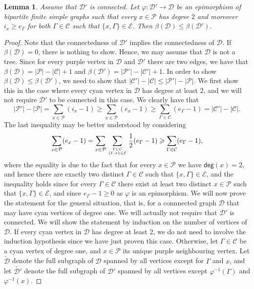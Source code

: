 \documentclass[a4paper,12pt,reqno]{amsart}
\newcommand\mc\mathcal
\newtheorem{lem}[thm]{Lemma}
\theoremstyle{definition}
\numberwithin{equation}{thm}
\renewcommand{\leq}{\leqslant}
\renewcommand{\geq}{\geqslant}
\renewcommand{\deg}{\mathsf{deg}}
\begin{document}
\begin{lem}\label{Betti-epimorphism} Assume that $\mc{D}'$ is connected.
    Let $\varphi: \mc{D}' \to \mc{D}$ be an epimorphism of bipartite finite simple graphs such that every $x\in \mc{P}$ has degree $2$ and moreover $i_x \geq e_\Gamma$ for both $\Gamma \in \mc{C}$ such that $\{x, \Gamma\} \in \mathcal{E}$.
    Then $\beta(\mc{D}) \leq \beta(\mc{D}')$.
\end{lem}
\begin{proof} Note that the connectedness of $\mc{D}'$ implies the connectedness of $\mc{D}$.
If $\beta(\mc{D})=0$, there is nothing to show. Hence, we may assume that $\mc{D}$ is not a tree.
Since for every purple vertex in $\mc{D}$ and $\mc{D}'$ there are two edges, we have that 
$\beta(\mathcal{D})=|\mc{P}|-|\mc{C}|+1$ and
$\beta(\mc{D}')=|\mc{P}'|-|\mc{C}'|+1$. 
In order to show $\beta(\mathcal{D})\leq \beta(\mathcal{D}')$, we need to show that $|\mc{C}'|-|\mc{C}|\leq |\mc{P}'|-|\mc{P}|.$
We first show this in the case where every cyan vertex in $\mathcal{D}$ has degree at least $2$, and we will not require $\mc{D}'$ to be connected in this case. We clearly have that 
$$|\mc{P}'|-|\mc{P}| = \sum_{x\in\mc{P}}(i_x-1)\geq \sum_{x\in\mc{P}}(e_x-1)\geq \sum_{\Gamma\in\mc{C}}(e_\Gamma-1)=|\mc{C}'|-|\mc{C}|.$$
The last inequality may be better understood by considering $$\sum_{x\in\mc{P}}(e_x-1)= \sum_{x\in\mc{P}} \sum_{\Gamma \in \mc C \atop \{\Gamma, x\} \in \mathcal{E}}\frac{1}{2}(e_{\Gamma}-1) \geq \sum_{\Gamma\in\mc{C}}(e_\Gamma-1),$$ where the equality is due to the fact that for every $x \in \mc{P}$ we have $\deg(x)=2$, and hence there are exactly two distinct $\Gamma \in \mc{C}$ such that $\{x, \Gamma\} \in \mc{E}$, and the inequality holds since for every $\Gamma \in \mc{C}$ there exist at least two distinct $x \in \mc{P}$ such that $\{x,\Gamma\} \in \mc{E}$, and since $e_\Gamma -1 \geq 0$ as $\varphi$ is an epimorphism.
We will now prove the statement for the general situation, that is, for a connnected graph $\mc{D}$ that may have cyan vertices of degree one. We will actually not require that $\mc{D}'$ is connected. We will show the statement by induction on the number of vertices of $\mc{D}$. If every cyan vertex in $\mc{D}$ has degree at least $2$, we do not need to involve the induction hypothesis since we have just proven this case. Otherwise, let $\Gamma \in \mc{C}$ be a cyan vertex of degree one, and $x \in \mc{P}$ its unique purple neighbouring vertex. Let $\widetilde{\mathcal{D}}$ denote the full subgraph of $\mathcal{D}$ spanned by all vertices except for $\Gamma$ and $x$, and let $\widetilde{\mathcal{D}'}$ denote the full subgraph of $\mathcal{D}'$ spanned by all vertices except $\varphi^{-1}(\Gamma)$ and $\varphi^{-1}(x)$.

\end{proof}
\end{document}
